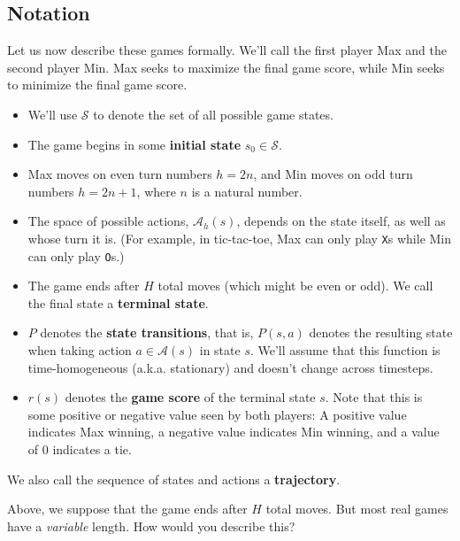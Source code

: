 \documentclass[
  letterpaper,
  DIV=11,
  numbers=noendperiod]{scrreprt}
\providecommand{\tightlist}{%
  \setlength{\itemsep}{0pt}\setlength{\parskip}{0pt}}\usepackage{longtable,booktabs,array}
\theoremstyle{plain}
\theoremstyle{plain}
\theoremstyle{definition}
\theoremstyle{definition}
\theoremstyle{remark}
\begin{document}
\subsection{Notation}\label{notation-1}

Let us now describe these games formally. We'll call the first player
Max and the second player Min. Max seeks to maximize the final game
score, while Min seeks to minimize the final game score.

\begin{itemize}
\tightlist
\item
  We'll use \(\mathcal{S}\) to denote the set of all possible game
  states.
\item
  The game begins in some \textbf{initial state}
  \(s_0 \in \mathcal{S}\).
\item
  Max moves on even turn numbers \(h = 2n\), and Min moves on odd turn
  numbers \(h = 2n+1\), where \(n\) is a natural number.
\item
  The space of possible actions, \(\mathcal{A}_h(s)\), depends on the
  state itself, as well as whose turn it is. (For example, in
  tic-tac-toe, Max can only play \texttt{X}s while Min can only play
  \texttt{O}s.)
\item
  The game ends after \(H\) total moves (which might be even or odd). We
  call the final state a \textbf{terminal state}.
\item
  \(P\) denotes the \textbf{state transitions}, that is, \(P(s, a)\)
  denotes the resulting state when taking action
  \(a \in \mathcal{A}(s)\) in state \(s\). We'll assume that this
  function is time-homogeneous (a.k.a. stationary) and doesn't change
  across timesteps.
\item
  \(r(s)\) denotes the \textbf{game score} of the terminal state \(s\).
  Note that this is some positive or negative value seen by both
  players: A positive value indicates Max winning, a negative value
  indicates Min winning, and a value of \(0\) indicates a tie.
\end{itemize}

We also call the sequence of states and actions a \textbf{trajectory}.

Above, we suppose that the game ends after \(H\) total moves. But most
real games have a \emph{variable} length. How would you describe this?
\end{document}
